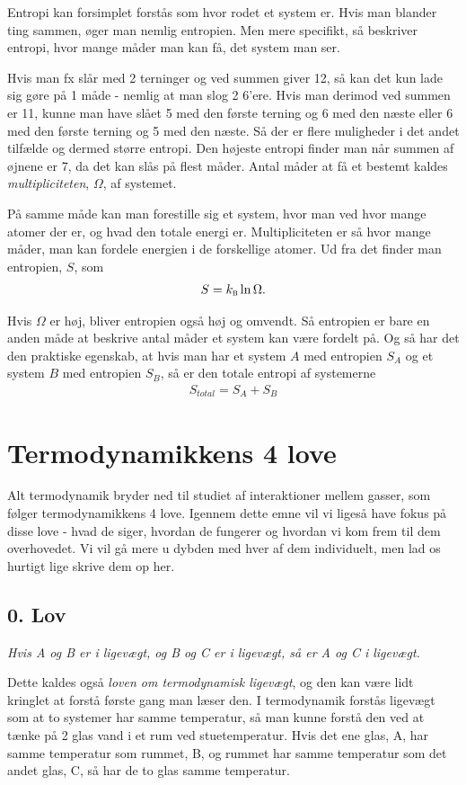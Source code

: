 \documentclass[crop=false, class=memoir]{standalone}
\begin{document}
Entropi kan forsimplet forstås som hvor rodet et system er. Hvis man blander ting sammen, øger man nemlig entropien. Men mere specifikt, så beskriver entropi, hvor mange måder man kan få, det system man ser. 

Hvis man fx slår med 2 terninger og ved summen giver 12, så kan det kun lade sig gøre på 1 måde - nemlig at man slog 2 6'ere. Hvis man derimod ved summen er 11, kunne man have slået 5 med den første terning og 6 med den næste eller 6 med den første terning og 5 med den næste. Så der er flere muligheder i det andet tilfælde og dermed større entropi. Den højeste entropi finder man når summen af øjnene er 7, da det kan slås på flest måder. Antal måder at få et bestemt kaldes \emph{multipliciteten}, $\Omega$, af systemet.

På samme måde kan man forestille sig et system, hvor man ved hvor mange atomer der er, og hvad den totale energi er. Multipliciteten er så hvor mange måder, man kan fordele energien i de forskellige atomer. Ud fra det finder man entropien, $S$, som
\begin{align}
    S = k_\textsc{b}\ln{\Omega}.
\end{align}

Hvis $\Omega$ er høj, bliver entropien også høj og omvendt. Så entropien er bare en anden måde at beskrive antal måder et system kan være fordelt på. Og så har det den praktiske egenskab, at hvis man har et system $A$ med entropien $S_A$ og et system $B$ med entropien $S_B$, så er den totale entropi af systemerne
\begin{align}
    S_{total} = S_A + S_B
\end{align}{}

\section{Termodynamikkens 4 love}

Alt termodynamik bryder ned til studiet af interaktioner mellem gasser, som følger termodynamikkens 4 love. Igennem dette emne vil vi ligeså have fokus på disse love - hvad de siger, hvordan de fungerer og hvordan vi kom frem til dem overhovedet. Vi vil gå mere u dybden med hver af dem individuelt, men lad os hurtigt lige skrive dem op her.

\subsection{0. Lov}

\begin{center}
    \textit{Hvis A og B er i ligevægt, og B og C er i ligevægt, så er A og C i ligevægt.}
\end{center}
Dette kaldes også \textit{loven om termodynamisk ligevægt}, og den kan være lidt kringlet at forstå første gang man læser den. I termodynamik forstås ligevægt som at to systemer har samme temperatur, så man kunne forstå den ved at tænke på 2 glas vand i et rum ved stuetemperatur. Hvis det ene glas, A, har samme temperatur som rummet, B, og rummet har samme temperatur som det andet glas, C, så har de to glas samme temperatur.
\end{document}
